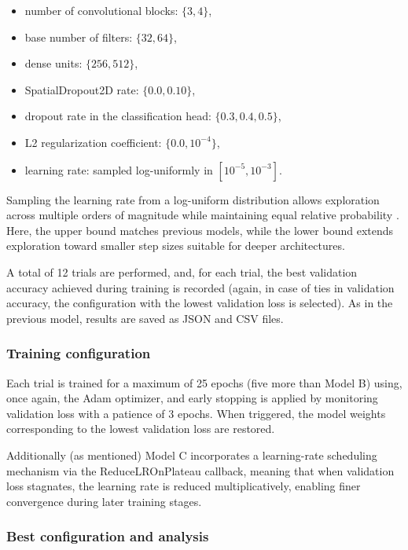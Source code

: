 \documentclass[11pt,a4paper]{article}
\begin{document}
\begin{itemize}
    \item number of convolutional blocks: $\{3,4\}$,
    \item base number of filters: $\{32,64\}$,
    \item dense units: $\{256,512\}$,
    \item SpatialDropout2D rate: $\{0.0, 0.10\}$,
    \item dropout rate in the classification head: $\{0.3, 0.4, 0.5\}$,
    \item L2 regularization coefficient: $\{0.0, 10^{-4}\}$,
    \item learning rate: sampled log-uniformly in $[10^{-5}, 10^{-3}]$.
\end{itemize}

Sampling the learning rate from a log-uniform distribution allows exploration across multiple orders of magnitude while maintaining equal relative probability \cite{bergstra_bengio_random_search}.  
Here, the upper bound matches previous models, while the lower bound extends exploration toward smaller step sizes suitable for deeper architectures.

A total of 12 trials are performed, and, for each trial, the best validation accuracy achieved during training is recorded (again, in case of ties in validation accuracy, the configuration with the lowest validation loss is selected).  
As in the previous model, results are saved as JSON and CSV files.

\subsubsection{Training configuration}

Each trial is trained for a maximum of 25 epochs (five more than Model B) using, once again, the Adam optimizer, and early stopping is applied by monitoring validation loss with a patience of 3 epochs. When triggered, the model weights corresponding to the lowest validation loss are restored.

Additionally (as mentioned) Model C incorporates a learning-rate scheduling mechanism via the ReduceLROnPlateau callback, meaning that when validation loss stagnates, the learning rate is reduced multiplicatively, enabling finer convergence during later training stages.

\subsubsection{Best configuration and analysis}
\end{document}
